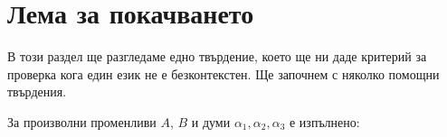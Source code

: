 \section{Лема за покачването}

В този раздел ще разгледаме едно твърдение, което ще ни даде критерий за проверка кога един език не е безконтекстен. Ще започнем с няколко помощни твърдения.

\begin{proposition}\label{pr:pumping:ground}
  За произволни променливи $A$, $B$ и думи $\alpha_1,\alpha_2, \alpha_3$ е изпълнено:
  \begin{prooftree}
  \end{prooftree}
\end{proposition}
